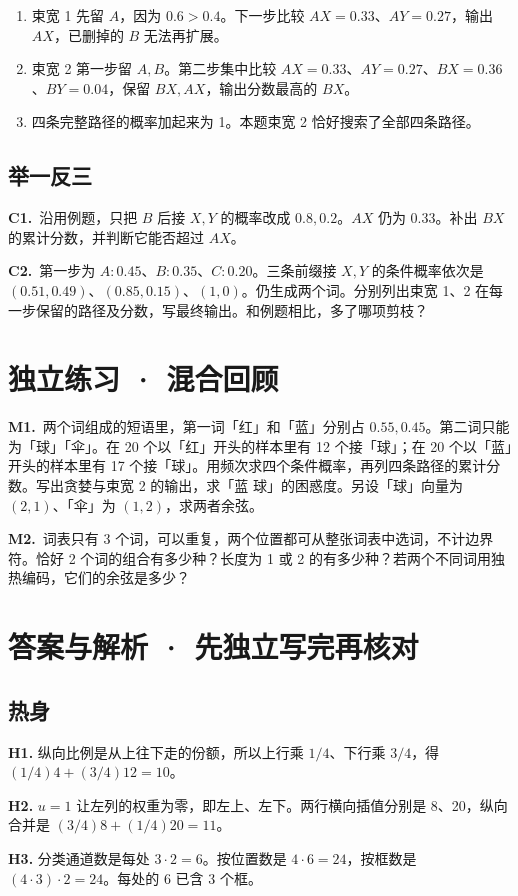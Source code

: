 \documentclass[UTF8,a4paper,11pt]{ctexart}
\newcommand{\CompactQuestion}[2]{\par\noindent\textbf{#1.}\ #2\par\vspace{.8em}}
\begin{document}
\begin{enumerate}
\item 束宽 1 先留 $A$，因为 $0.6>0.4$。下一步比较 $AX=0.33$、$AY=0.27$，输出 $AX$，已删掉的 $B$ 无法再扩展。
\item 束宽 2 第一步留 $A,B$。第二步集中比较 $AX=0.33$、$AY=0.27$、$BX=0.36$、$BY=0.04$，保留 $BX,AX$，输出分数最高的 $BX$。
\item 四条完整路径的概率加起来为 1。本题束宽 2 恰好搜索了全部四条路径。
\end{enumerate}
\subsection{举一反三}
\CompactQuestion{C1}{沿用例题，只把 $B$ 后接 $X,Y$ 的概率改成 $0.8,0.2$。$AX$ 仍为 0.33。补出 $BX$ 的累计分数，并判断它能否超过 $AX$。}
\CompactQuestion{C2}{第一步为 $A:0.45$、$B:0.35$、$C:0.20$。三条前缀接 $X,Y$ 的条件概率依次是 $(0.51,0.49)$、$(0.85,0.15)$、$(1,0)$。仍生成两个词。分别列出束宽 1、2 在每一步保留的路径及分数，写最终输出。和例题相比，多了哪项剪枝？}
\clearpage
\section{独立练习 · 混合回顾}
\CompactQuestion{M1}{两个词组成的短语里，第一词「红」和「蓝」分别占 $0.55,0.45$。第二词只能为「球」「伞」。在 20 个以「红」开头的样本里有 12 个接「球」；在 20 个以「蓝」开头的样本里有 17 个接「球」。用频次求四个条件概率，再列四条路径的累计分数。写出贪婪与束宽 2 的输出，求「蓝 球」的困惑度。另设「球」向量为 $(2,1)$、「伞」为 $(1,2)$，求两者余弦。}
\CompactQuestion{M2}{词表只有 3 个词，可以重复，两个位置都可从整张词表中选词，不计边界符。恰好 2 个词的组合有多少种？长度为 1 或 2 的有多少种？若两个不同词用独热编码，它们的余弦是多少？}
\clearpage
\section{答案与解析 · 先独立写完再核对}
\subsection{热身}
\textbf{H1.} 纵向比例是从上往下走的份额，所以上行乘 $1/4$、下行乘 $3/4$，得 $(1/4)4+(3/4)12=10$。

\textbf{H2.} $u=1$ 让左列的权重为零，即左上、左下。两行横向插值分别是 8、20，纵向合并是 $(3/4)8+(1/4)20=11$。

\textbf{H3.} 分类通道数是每处 $3\cdot2=6$。按位置数是 $4\cdot6=24$，按框数是 $(4\cdot3)\cdot2=24$。每处的 6 已含 3 个框。
\end{document}
